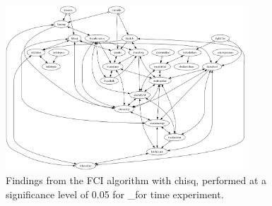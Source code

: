 \begin{figure}[htbp]
    \centering
    \includegraphics[width=0.8\textwidth]{Report/final_report/pictures/FCI_chisq_0.05__for time experiment.png}
    \caption{Findings from the FCI algorithm with chisq, performed at a significance level of 0.05 for _for time experiment.}
    \label{fig:fci_chisq_0.05_for time experiment}
\end{figure}
